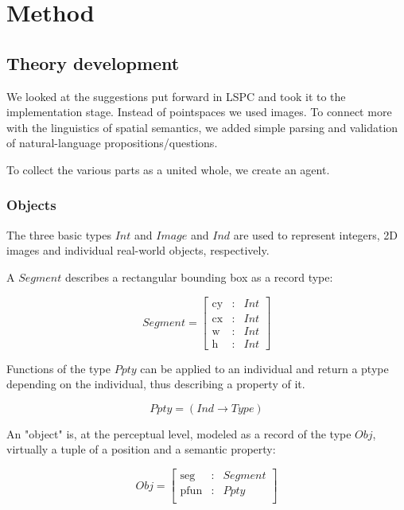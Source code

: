 \documentclass[11pt, a4paper]{article}
\begin{document}
\section{Method}
\label{sec:method}



\subsection{Theory development}

We looked at the suggestions put forward in LSPC and took it to the implementation stage.
Instead of pointspaces we used images.
To connect more with the linguistics of spatial semantics, we added simple parsing and validation of natural-language propositions/questions.

To collect the various parts as a united whole, we create an agent.



\subsubsection{Objects}

The three basic types $Int$ and $Image$ and $Ind$ are used to represent integers, 2D images and individual real-world objects, respectively.

A $Segment$ describes a rectangular bounding box as a record type:

\begin{equation}\label{eq:seg}
Segment = \left[\begin{array}{rcl}
\text{cy} &:& Int\\
\text{cx} &:& Int\\
\text{w} &:& Int\\
\text{h} &:& Int
\end{array}\right]\end{equation}

Functions of the type $Ppty$ can be applied to an individual and return a ptype depending on the individual, thus describing a property of it.

\begin{equation}\label{eq:ppty}
Ppty = (Ind \rightarrow Type)\end{equation}

An "object" is, at the perceptual level, modeled as a record of the type $Obj$, virtually a tuple of a position and a semantic property:

\begin{equation}\label{eq:obj}
Obj = \left[\begin{array}{rcl}
\text{seg} &:& Segment\\
\text{pfun} &:& Ppty \\
\end{array}\right]\end{equation}
\end{document}
